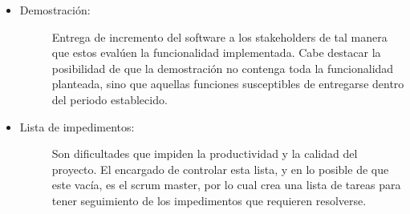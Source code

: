 \begin{itemize}
    \item   \begin{description}
                \item[Demostración:] Entrega de incremento del software a los stakeholders de tal manera que estos evalúen la funcionalidad implementada. Cabe destacar la posibilidad de que la demostración no contenga toda la funcionalidad planteada, sino que aquellas funciones susceptibles de entregarse dentro del periodo establecido.
            \end{description}
    
    \item   \begin{description}
                \item[Lista de impedimentos: ]  Son dificultades que impiden la productividad y la calidad del proyecto. El encargado de controlar esta lista, y en lo posible de que este vacía, es el scrum master, por lo cual crea una lista de tareas para tener seguimiento de los impedimentos que requieren resolverse. 
            \end{description}
\end{itemize}

